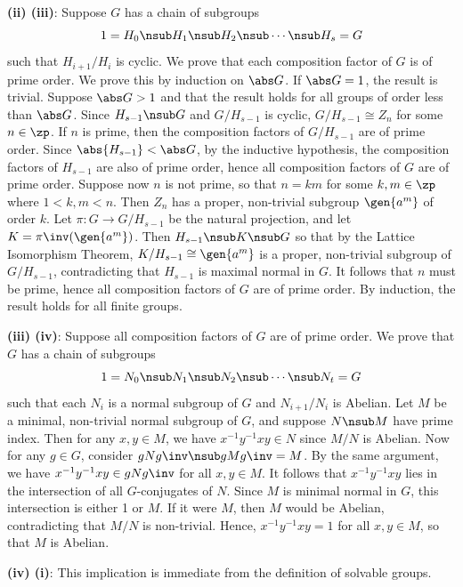 \begin{sol}
    \textbf{(ii) \rightimp (iii)}: Suppose $G$ has a chain of subgroups
    \[
    	1 = H_0 \nsub H_1 \nsub H_2 \nsub \cdots \nsub H_s = G
    \]
    such that $H_{i + 1}/H_i$ is cyclic.
	We prove that each composition factor of $G$ is of prime order.
	We prove this by induction on $\abs G$.
	If $\abs G = 1$, the result is trivial.
	Suppose $\abs G > 1$ and that the result holds for all groups of order less than $\abs G$.
	Since $H_{s - 1} \nsub G$ and $G/H_{s - 1}$ is cyclic, $G/H_{s - 1} \cong Z_n$ for some $n \in \zp$.
	If $n$ is prime, then the composition factors of $G/H_{s - 1}$ are of prime order.
	Since $\abs{H_{s - 1}} < \abs G$, by the inductive hypothesis, the composition factors of $H_{s - 1}$ are also of prime order, hence all composition factors of $G$ are of prime order.
	Suppose now $n$ is not prime, so that $n = km$ for some $k, m \in \zp$ where $1 < k, m < n$.
	Then $Z_n$ has a proper, non-trivial subgroup $\gen{a^m}$ of order $k$.
	Let $\pi : G \to G/H_{s - 1}$ be the natural projection, and let $K = \pi\inv(\gen{a^m})$.
	Then $H_{s - 1} \nsub K \nsub G$ so that by the Lattice Isomorphism Theorem, $K/H_{s - 1} \cong \gen{a^m}$ is a proper, non-trivial subgroup of $G/H_{s - 1}$, contradicting that $H_{s - 1}$ is maximal normal in $G$.
	It follows that $n$ must be prime, hence all composition factors of $G$ are of prime order.
	By induction, the result holds for all finite groups.

    \textbf{(iii) \rightimp (iv)}: Suppose all composition factors of $G$ are of prime order.
	We prove that $G$ has a chain of subgroups
    \[
    	1 = N_0 \nsub N_1 \nsub N_2 \nsub \cdots \nsub N_t = G
    \]
    such that each $N_i$ is a normal subgroup of $G$ and $N_{i + 1}/N_i$ is Abelian.
	Let $M$ be a minimal, non-trivial normal subgroup of $G$, and suppose $N \nsub M$ have prime index.
	Then for any $x, y \in M$, we have $x^{-1}y^{-1}xy \in N$ since $M/N$ is Abelian.
	Now for any $g \in G$, consider $gNg\inv \nsub gMg\inv = M$.
	By the same argument, we have $x^{-1}y^{-1}xy \in gNg\inv$ for all $x, y \in M$.
	It follows that $x^{-1}y^{-1}xy$ lies in the intersection of all $G$-conjugates of $N$.
	Since $M$ is minimal normal in $G$, this intersection is either 1 or $M$.
	If it were $M$, then $M$ would be Abelian, contradicting that $M/N$ is non-trivial.
	Hence, $x^{-1}y^{-1}xy = 1$ for all $x, y \in M$, so that $M$ is Abelian.

    \textbf{(iv) \rightimp (i)}: This implication is immediate from the definition of solvable groups.
\end{sol}

